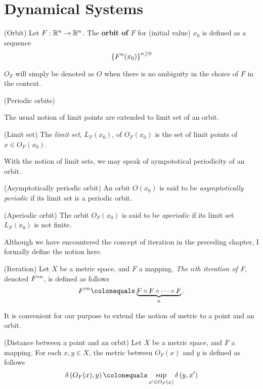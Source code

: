 \documentclass[12pt,twoside,draft]{book}
\begin{document}
\section{Dynamical Systems}

\begin{definition}
  (Orbit)
  Let $F: \mathbb{R}^n \to \mathbb{R}^n$. 
  The \textbf{orbit of $F$} for (initial value) $x_0$ is defined as a sequence
  \begin{equation*}
    \left \{ F^n(x_0) \right \}^{n\geq 0}_{ }
  \end{equation*}
  \label{def:orbit}
\end{definition}
$O_F$ will simply be denoted as $O$ when there is no ambiguity in the choice of $F$ in the context.

\begin{definition}
  (Periodic orbits)
  \label{def:porbit}
\end{definition}

The usual notion of limit points are extended to limit set of an orbit.
\begin{definition}
  (Limit set)
  The \textit{limit set}, $L_F(x_0)$, of $O_F(x_0)$ is the set of limit points of $x \in O_F(x_0)$.
  \label{def:limset}
\end{definition}

With the notion of limit sets, we may speak of aympototical periodicity of an orbit.
\begin{definition}
  (Asymptotically periodic orbit)
  An orbit $O(x_0)$ is said to be \textit{asymptotically periodic} if its limit set is a periodic orbit.
  \label{def:asymporb}
\end{definition}

\begin{definition}
  (Aperiodic orbit)
  The orbit $O_F(x_0)$ is said to be \textit{aperiodic} if its limit set $L_F(x_0)$ is not finite.
  \label{def:aporbit}
\end{definition}

Although we have encountered the concept of iteration in the preceding chapter, I formally define the notion here.
\begin{definition}
  (Iteration)
  Let $X$ be a metric space, and $F$ a mapping.
  \textit{The $n$th iteration of F}, denoted $F^{\circ n}$, is defined as follows
  \begin{equation*}
    \itr{F}{n} \ceq \underbrace{F \circ F \circ \cdots \circ F}_{n} .
  \end{equation*}
\end{definition}
%
It is convenient for our purpose to extend the notion of metric to a point and an orbit.
\begin{definition}
  (Distance between a point and an orbit)
  Let $X$ be a metric space, and $F$ a mapping.
  For each $x,y \in X$, the metric between $O_F(x)$ and $y$ is defined as follows
  \begin{equation*}
    \metric{O_F(x),y} \ceq \sup\limits_{x' \in O_F(x)} \metric{y,x'}
  \end{equation*}
\end{definition}
\end{document}
